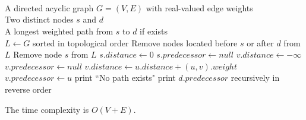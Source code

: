 \documentclass{article}
\begin{document}
\section{}
\begin{algorithm}[H]
  	\begin{algorithmic}
    		\Require \\
    			A directed acyclic graph $G=(V,E)$ with real-valued edge weights \\
    			Two distinct nodes $s$ and $d$
    		\Ensure \\
    			A longest weighted path from $s$ to $d$ if exists \\

    		\State $L \gets G$ sorted in topological order
    		\State Remove nodes located before $s$ or after $d$ from $L$
    		\State Remove node $s$ from $L$
    		\State $s.distance \gets 0$
    		\State $s.predecessor \gets null$
    		    \State $v.distance \gets -\infty$
    		    \State $v.predecessor \gets null$
    				        \State $v.distance \gets u.distance + (u,v).weight$
                    \State $v.predecessor \gets u$
                \EndIf
    		    \EndFor
    		\EndFor
            \State print ``No path exists"
    		\Else
    			  \State print $d.predecessor$ recursively in reverse order
    		\EndIf
  	\end{algorithmic}
\end{algorithm}

The time complexity is $O(V+E)$.
\end{document}
